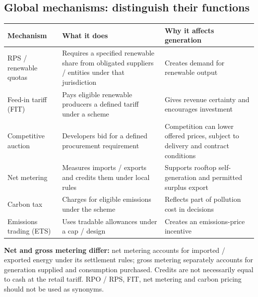 \documentclass[11pt,a4paper]{article}
\begin{document}
\subsection{Global mechanisms: distinguish their functions}
\begin{center}\small
\begin{tabularx}{\textwidth}{L{3.3cm}YY}
\toprule\textbf{Mechanism} & \textbf{What it does} & \textbf{Why it affects generation}\\\midrule
RPS / renewable quotas & Requires a specified renewable share from obligated suppliers / entities under that jurisdiction & Creates demand for renewable output\\
Feed-in tariff (FIT) & Pays eligible renewable producers a defined tariff under a scheme & Gives revenue certainty and encourages investment\\
Competitive auction & Developers bid for a defined procurement requirement & Competition can lower offered prices, subject to delivery and contract conditions\\
Net metering & Measures imports / exports and credits them under local rules & Supports rooftop self-generation and permitted surplus export\\
Carbon tax & Charges for eligible emissions under the scheme & Reflects part of pollution cost in decisions\\
Emissions trading (ETS) & Uses tradable allowances under a cap / design & Creates an emissions-price incentive\\\bottomrule
\end{tabularx}\end{center}
\textbf{Net and gross metering differ:} net metering accounts for imported / exported energy under its settlement rules; gross metering separately accounts for generation supplied and consumption purchased. Credits are not necessarily equal to cash at the retail tariff. RPO / RPS, FIT, net metering and carbon pricing should not be used as synonyms.
\end{document}
